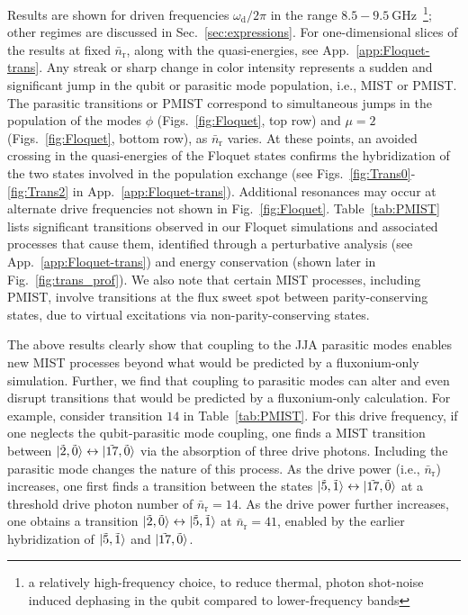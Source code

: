 \documentclass[%
reprint,
superscriptaddress,
 amsmath,amssymb,
 aps,
 prx,
longbibliography,
floatfix,
]{revtex4-2}
\begin{document}
Results are shown for driven frequencies $\omega_\textrm{d} / 2 \pi$ in the range $8.5 - 9.5 \ \mathrm{GHz}$~\footnote{a relatively high-frequency choice, to reduce thermal, photon shot-noise induced dephasing in the qubit compared to lower-frequency bands}; other regimes are discussed in Sec.~\ref{sec:expressions}. For one-dimensional slices of the results at fixed $\bar n_\textrm{r}$, along with the quasi-energies, see App.~\ref{app:Floquet-trans}. Any streak or sharp change in color intensity represents a sudden and significant jump in the qubit or parasitic mode population, i.e., MIST or PMIST. The parasitic transitions or PMIST correspond to simultaneous jumps in the population of the modes $\phi$ (Figs.~\ref{fig:Floquet}, top row) and $\mu=2$ (Figs.~\ref{fig:Floquet}, bottom row), as $\bar{n}_\textrm{r}$ varies. At these points, an avoided crossing in the quasi-energies of the Floquet states confirms the hybridization of the two states involved in the population exchange (see Figs.~\ref{fig:Trans0}-\ref{fig:Trans2} in App.~\ref{app:Floquet-trans}). Additional resonances may occur at alternate drive frequencies not shown in Fig.~\ref{fig:Floquet}. Table~\ref{tab:PMIST} lists significant transitions observed in our Floquet simulations and associated processes that cause them, identified through a perturbative analysis (see App.~\ref{app:Floquet-trans}) and energy conservation (shown later in Fig.~\ref{fig:trans_prof}). We also note that certain MIST processes, including PMIST, involve transitions at the flux sweet spot between parity-conserving states, due to virtual excitations via non-parity-conserving states.

The above results clearly show that coupling to the JJA parasitic modes enables new MIST processes beyond what would be predicted by a fluxonium-only simulation. Further, we find that coupling to parasitic modes can alter and even disrupt transitions that would be predicted by a fluxonium-only calculation. For example, consider transition $14$ in Table~\ref{tab:PMIST}. For this drive frequency, if one neglects the qubit-parasitic mode coupling, one finds a MIST transition between $\ket{\tilde{2},\tilde{0}} \leftrightarrow \ket{\tilde{17},\tilde{0}}$ via the absorption of three drive photons. Including the parasitic mode changes the nature of this process. As the drive power (i.e., $\bar{n}_\textrm{r}$) increases, one first finds a transition between the states $\ket{\tilde{5},\tilde{1}}\leftrightarrow \ket{\tilde{17},\tilde{0}}$ at a threshold drive photon number of $\bar n_\textrm{r}=14$. As the drive power further increases, one obtains a transition $\ket{\tilde{2},\tilde{0}}\leftrightarrow \ket{\tilde{5},\tilde{1}}$ at $\bar n_\textrm{r}=41$, enabled by the earlier hybridization of $\ket{\tilde{5},\tilde{1}}$ and $\ket{\tilde{17},\tilde{0}}$.
\end{document}
